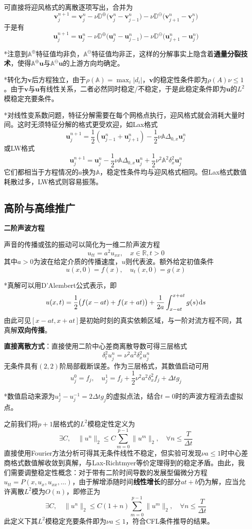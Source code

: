 \documentclass[a4paper,UTF8,fontset=windows]{ctexart}
\newcommand*{\dr}{\hspace{0.07em}\mathrm{d}}
\newcommand*{\bu}{\mathbf{u}}
\begin{document}
可直接将迎风格式的离散逐项写出，合并为
$$\mathbf{v}_j^{n+1}=\mathbf{v}_j^n-\nu\mathbb{D}^\oplus\big(\mathbf{v}_j^n-\mathbf{v}_{j-1}^n\big)-\nu\mathbb{D}^\ominus\big(\mathbf{v}_{j+1}^n-\mathbf{v}_j^n\big)$$
于是有
$$\bu_j^{n+1}=\bu_j^n-\nu\mathbb{D}^\oplus\big(\bu_j^n-\bu_{j-1}^n\big)-\nu\mathbb{D}^\ominus\big(\bu_{j+1}^n-\bu_j^n\big)$$

*注意到$\mathbb{A}^\oplus$特征值均非负，$\mathbb{A}^\ominus$特征值均非正，这样的分解事实上隐含着\textbf{通量分裂技术}，使得$\mathbb{A}^\oplus\bu$与$\mathbb{A}^\ominus\bu$的上游方向均确定。

*转化为$\mathbf{v}$后方程独立，由于$\rho(\mathbb{A})=\max_i|d_i|$，$\mathbf{v}$的稳定性条件即为$\rho(A)\nu\le1$。由于$\mathbf{v}$与$\bu$有线性关系，二者必然同时稳定/不稳定，于是此稳定条件即为$\bu$的$L^2$模稳定充要条件。

*对线性变系数问题，特征分解需要在每个网格点执行，迎风格式就会消耗大量时间。这时无须特征分解的格式更受欢迎，如Lax格式
$$\bu_j^{n+1}=\frac{1}{2}(\bu_{j-1}^n+\bu_{j+1}^n)-\frac{1}{2}\nu\mathbb{A}\Delta_{0,x}\bu_j^n$$
或LW格式
$$\bu_j^{n+1}=\bu_j^n-\frac{1}{2}\nu\mathbb{A}\Delta_{0,x}\bu_j^n+\frac{1}{2}\nu^2\mathbb{A}^2\delta_x^2\bu_j^n$$
它们都相当于方程情况的$a$换为$\mathbb{A}$，稳定性条件均与迎风格式相同。但Lax格式数值耗散过多，LW格式则容易振荡。

\subsection{高阶与高维推广}
\textbf{二阶声波方程}

声音的传播或弦的振动可以简化为一维二阶声波方程
$$u_{tt}=a^2u_{xx},\quad x\in\mathbb{R},t>0$$
其中$a>0$为波在给定介质的传播速度，$u$则代表波。额外给定初值条件
$$u(x,0)=f(x),\quad u_t(x,0)=g(x)$$

*真解可以用D'Alembert公式表示，即
$$u(x,t)=\frac{1}{2}\big(f(x-at)+f(x+at)\big)+\frac{1}{2a}\int_{x-at}^{x+at}g(s)\dr s$$
由此可见$[x-at,x+at]$是初始时刻的真实依赖区域，与一阶对流方程不同，其真解\textbf{双向传播}。

\textbf{直接离散方式}：直接使用二阶中心差商离散导数可得三层格式
$$\delta_t^2u_j^n=\nu^2a^2\delta_x^2u_j^n$$
无条件具有$(2,2)$阶局部截断误差。作为三层格式，其数值启动可用
$$u_j^0=f_j,\quad u_j^1=f_j+\frac{1}{2}\nu^2a^2\delta_x^2f_j+\Delta tg_j$$

*数值启动来源为$u_j^1-u_j^{-1}=2\Delta tg_j$的虚拟点法，结合$t=0$时的声波方程消去虚拟点。

之前我们将$p+1$层格式的$L^2$模稳定性定义为
$$\exists C,\quad\|u^n\|_2\le C\sum_{m=0}^{p-1}\|u^m\|_2,\quad\forall n\le\frac{T}{\Delta t}$$
直接使用Fourier方法分析可得其无条件线性不稳定，但实验可发现$\nu a\le1$时中心差商格式数值解收敛到真解，与Lax-Richtmyer等价定理得到的稳定矛盾。由此，我们需要调整稳定性概念：对于带有二阶时间导数的发展型偏微分方程$u_{tt}=P(x,u_x,u_{xx},\dots)$，由于解增添随时间\textbf{线性增长}的部分$at+b$仍为解，应当允许离散$L^2$模为$O(n)$，即修正为
$$\exists C,\quad\|u^n\|_2\le C(1+n)\sum_{m=0}^{p-1}\|u^m\|_2,\quad\forall n\le\frac{T}{\Delta t}$$
此定义下其$L^2$模稳定充要条件即为$\nu a\le1$，符合CFL条件推导的结果。
\end{document}

